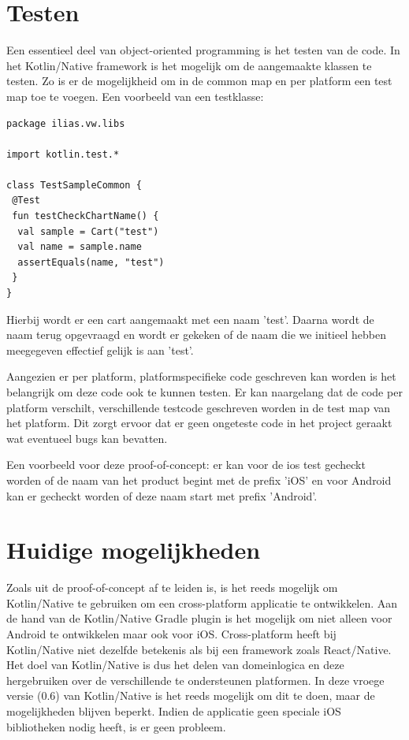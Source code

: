 \section{Testen}
\label{sec:testing}
Een essentieel deel van object-oriented programming is het testen van de code. In het Kotlin/Native framework is het mogelijk om de aangemaakte klassen te testen. Zo is er de mogelijkheid om in de common map en per platform een test map toe te voegen. Een voorbeeld van een testklasse:

\begin{lstlisting}
package ilias.vw.libs

import kotlin.test.*

class TestSampleCommon {
 @Test
 fun testCheckChartName() {
  val sample = Cart("test")
  val name = sample.name
  assertEquals(name, "test")
 }
}

\end{lstlisting}

Hierbij wordt er een cart aangemaakt met een naam 'test'. Daarna wordt de naam terug opgevraagd en wordt er gekeken of de naam die we initieel hebben meegegeven effectief gelijk is aan 'test'.

Aangezien er per platform, platformspecifieke code geschreven kan worden is het belangrijk om deze code ook te kunnen testen. Er kan naargelang dat de code per platform verschilt, verschillende testcode geschreven worden in de test map van het platform. Dit zorgt ervoor dat er geen ongeteste code in het project geraakt wat eventueel bugs kan bevatten. 

Een voorbeeld voor deze proof-of-concept: er kan voor de ios test gecheckt worden of de naam van het product begint met de prefix 'iOS' en voor Android kan er gecheckt worden of deze naam start met prefix 'Android'.

\section{Huidige mogelijkheden}
Zoals uit de proof-of-concept af te leiden is, is het reeds mogelijk om Kotlin/Native te gebruiken om een cross-platform applicatie te ontwikkelen. Aan de hand van de Kotlin/Native Gradle plugin is het mogelijk om niet alleen voor Android te ontwikkelen maar ook voor iOS. Cross-platform heeft bij Kotlin/Native niet dezelfde betekenis als bij een framework zoals React/Native. Het doel van Kotlin/Native is dus het delen van domeinlogica en deze hergebruiken over de verschillende te ondersteunen platformen. In deze vroege versie (0.6) van Kotlin/Native is het reeds mogelijk om dit te doen, maar de mogelijkheden blijven beperkt. Indien de applicatie geen speciale iOS bibliotheken nodig heeft, is er geen probleem.

